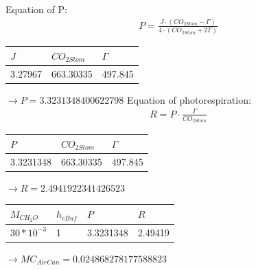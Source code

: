 \documentclass[a4paper]{article}
\numberwithin{equation}{section}
\begin{document}
\begin{itemize}
Equation of P:
\begin{align*}
          P = \frac{J \cdot (CO_{2Stom} - \Gamma)}{4 \cdot (CO_{2Stom} + 2\Gamma)}
\end{align*}
\begin{table}[H]
\centering
\begin{tabular}{|l|l|l|}
\hline
\rowcolor[HTML]{FFFC9E} 
\textbf{$J$} & \textbf{$CO_{2Stom}$} & \cellcolor[HTML]{FFFC9E}\textbf{$\Gamma$} \\ \hline
3.27967           &     663.30335          &   497.845                       \\ \hline
\end{tabular}
\end{table}
$\rightarrow P = 3.3231348400622798$
Equation of photorespiration:
\begin{align*}
          R = P \cdot \frac{\Gamma}{CO_{2Stom}}
 \end{align*}
 \begin{table}[H]
\centering
\begin{tabular}{|l|l|l|}
\hline
\rowcolor[HTML]{FFFC9E} 
\textbf{$P$} & \textbf{$CO_{2Stom}$} & \cellcolor[HTML]{FFFC9E}\textbf{$\Gamma$} \\ \hline
3.3231348           &     663.30335          &   497.845                       \\ \hline
\end{tabular}
\end{table}
$\rightarrow R = 2.4941922341426523$
\begin{table}[H]
\centering
\begin{tabular}{|l|l|l|l|}
\hline
\rowcolor[HTML]{FFFC9E} 
\textbf{$M_{CH_2O}$} & \textbf{$h_{cBuf}$} & \cellcolor[HTML]{FFFC9E}\textbf{$P$} & \cellcolor[HTML]{FFFC9E}\textbf{$R$}\\ \hline
$30*10^{-3}$          &     1           &   3.3231348           &      2.49419                 \\ \hline
\end{tabular}
\end{table}
$\rightarrow MC_{AirCan} = 0.024868278177588823$


\end{itemize}
\end{document}
